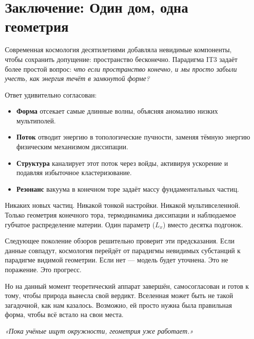 \documentclass[12pt,a4paper,oneside]{book}
\begin{document}
\backmatter

\chapter*{Заключение: Один дом, одна геометрия}

Современная космология десятилетиями добавляла невидимые компоненты, чтобы сохранить допущение: пространство бесконечно. Парадигма IT3 задаёт более простой вопрос: \emph{что если пространство конечно, и мы просто забыли учесть, как энергия течёт в замкнутой форме?}

Ответ удивительно согласован:
\begin{itemize}
    \item \textbf{Форма} отсекает самые длинные волны, объясняя аномалию низких мультиполей.
    \item \textbf{Поток} отводит энергию в топологические пучности, заменяя тёмную энергию физическим механизмом диссипации.
    \item \textbf{Структура} каналирует этот поток через войды, активируя ускорение и подавляя избыточное кластеризование.
    \item \textbf{Резонанс} вакуума в конечном торе задаёт массу фундаментальных частиц.
\end{itemize}

Никаких новых частиц. Никакой тонкой настройки. Никакой мультивселенной. Только геометрия конечного тора, термодинамика диссипации и наблюдаемое губчатое распределение материи. Один параметр ($L_x$) вместо десятка подгонок.

Следующее поколение обзоров решительно проверит эти предсказания. Если данные совпадут, космология перейдёт от парадигмы невидимых субстанций к парадигме видимой геометрии. Если нет — модель будет уточнена. Это не поражение. Это прогресс.

Но на данный момент теоретический аппарат завершён, самосогласован и готов к тому, чтобы природа вынесла свой вердикт. Вселенная может быть не такой загадочной, как нам казалось. Возможно, ей просто нужна была правильная форма, чтобы всё встало на свои места.

\vspace{2cm}
\begin{flushright}
\textit{«Пока учёные ищут окружности, геометрия уже работает.»}
\end{flushright}
\end{document}
